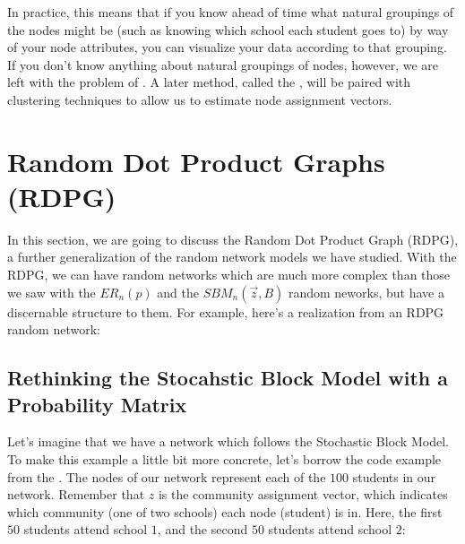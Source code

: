 \documentclass[letterpaper,10pt,english]{jupyterBook}
\begin{document}
\sphinxAtStartPar
In practice, this means that if you know ahead of time what natural groupings of the nodes might be (such as knowing which school each student goes to) by way of your node attributes, you can visualize your data according to that grouping. If you don’t know anything about natural groupings of nodes, however, we are left with the problem of . A later method, called the , will be paired with clustering techniques to allow us to estimate node assignment vectors.


\section{Random Dot Product Graphs (RDPG)}
\label{\detokenize{representations/ch5/single-network-models_RDPG:random-dot-product-graphs-rdpg}}\label{\detokenize{representations/ch5/single-network-models_RDPG::doc}}
\sphinxAtStartPar
In this section, we are going to discuss the Random Dot Product Graph (RDPG), a further generalization of the random network models we have studied. With the RDPG, we can have random networks which are much more complex than those we saw with the \(ER_n(p)\) and the \(SBM_n(\vec z, B)\) random neworks, but  have a discernable structure to them. For example, here’s a realization from an RDPG random network:

\noindent{}


\subsection{Rethinking the Stocahstic Block Model with a Probability Matrix}
\label{\detokenize{representations/ch5/single-network-models_RDPG:rethinking-the-stocahstic-block-model-with-a-probability-matrix}}
\sphinxAtStartPar
Let’s imagine that we have a network which follows the Stochastic Block Model. To make this example a little bit more concrete, let’s borrow the code example from the . The nodes of our network represent each of the \(100\) students in our network. Remember that \(z\) is the community assignment vector, which indicates which community (one of two schools) each node (student) is in. Here, the first \(50\) students attend school \(1\), and the second \(50\) students attend school \(2\):

\noindent{}
\end{document}
